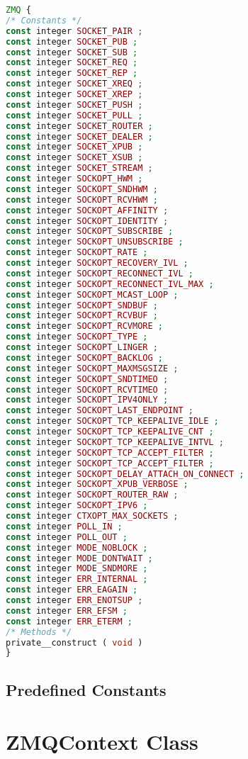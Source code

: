 \begin{lstlisting}[language=PHP]
ZMQ {
/* Constants */
const integer SOCKET_PAIR ;
const integer SOCKET_PUB ;
const integer SOCKET_SUB ;
const integer SOCKET_REQ ;
const integer SOCKET_REP ;
const integer SOCKET_XREQ ;
const integer SOCKET_XREP ;
const integer SOCKET_PUSH ;
const integer SOCKET_PULL ;
const integer SOCKET_ROUTER ;
const integer SOCKET_DEALER ;
const integer SOCKET_XPUB ;
const integer SOCKET_XSUB ;
const integer SOCKET_STREAM ;
const integer SOCKOPT_HWM ;
const integer SOCKOPT_SNDHWM ;
const integer SOCKOPT_RCVHWM ;
const integer SOCKOPT_AFFINITY ;
const integer SOCKOPT_IDENTITY ;
const integer SOCKOPT_SUBSCRIBE ;
const integer SOCKOPT_UNSUBSCRIBE ;
const integer SOCKOPT_RATE ;
const integer SOCKOPT_RECOVERY_IVL ;
const integer SOCKOPT_RECONNECT_IVL ;
const integer SOCKOPT_RECONNECT_IVL_MAX ;
const integer SOCKOPT_MCAST_LOOP ;
const integer SOCKOPT_SNDBUF ;
const integer SOCKOPT_RCVBUF ;
const integer SOCKOPT_RCVMORE ;
const integer SOCKOPT_TYPE ;
const integer SOCKOPT_LINGER ;
const integer SOCKOPT_BACKLOG ;
const integer SOCKOPT_MAXMSGSIZE ;
const integer SOCKOPT_SNDTIMEO ;
const integer SOCKOPT_RCVTIMEO ;
const integer SOCKOPT_IPV4ONLY ;
const integer SOCKOPT_LAST_ENDPOINT ;
const integer SOCKOPT_TCP_KEEPALIVE_IDLE ;
const integer SOCKOPT_TCP_KEEPALIVE_CNT ;
const integer SOCKOPT_TCP_KEEPALIVE_INTVL ;
const integer SOCKOPT_TCP_ACCEPT_FILTER ;
const integer SOCKOPT_TCP_ACCEPT_FILTER ;
const integer SOCKOPT_DELAY_ATTACH_ON_CONNECT ;
const integer SOCKOPT_XPUB_VERBOSE ;
const integer SOCKOPT_ROUTER_RAW ;
const integer SOCKOPT_IPV6 ;
const integer CTXOPT_MAX_SOCKETS ;
const integer POLL_IN ;
const integer POLL_OUT ;
const integer MODE_NOBLOCK ;
const integer MODE_DONTWAIT ;
const integer MODE_SNDMORE ;
const integer ERR_INTERNAL ;
const integer ERR_EAGAIN ;
const integer ERR_ENOTSUP ;
const integer ERR_EFSM ;
const integer ERR_ETERM ;
/* Methods */
private__construct ( void )
}
\end{lstlisting}



\section{Predefined Constants}



\chapter{ZMQContext Class}


